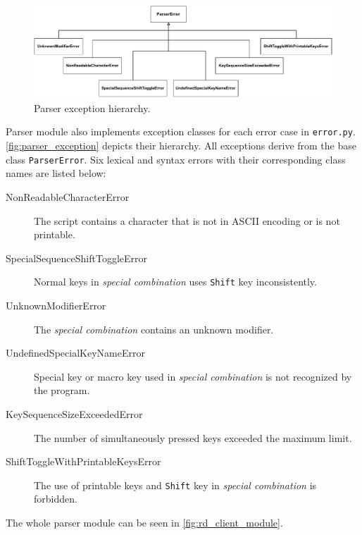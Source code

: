 \begin{figure}[ht]
    \centering
    \includegraphics[width=\linewidth]{./obrazky-figures/exception_classes.pdf}
    \caption{Parser exception hierarchy.}
    \label{fig:parser_exception}
\end{figure}

Parser module also implements exception classes for each error case in \verb|error.py|. \autoref{fig:parser_exception} depicts their hierarchy. All exceptions derive from the base class \verb|ParserError|. Six lexical and syntax errors with their corresponding class names are listed below:
\begin{description}
    \item [NonReadableCharacterError] The script contains a character that is not in ASCII encoding or is not printable.
    \item [SpecialSequenceShiftToggleError] Normal keys in \emph{special combination} uses \texttt{Shift} key inconsistently.
    \item [UnknownModifierError] The \emph{special combination} contains an unknown modifier.
    \item [UndefinedSpecialKeyNameError] Special key or macro key used in \emph{special combination} is not recognized by the program.
    \item [KeySequenceSizeExceededError] The number of simultaneously pressed keys exceeded the maximum limit.
    \item [ShiftToggleWithPrintableKeysError] The use of printable keys and \texttt{Shift} key in \emph{special combination} is forbidden.
\end{description}
The whole parser module can be seen in \autoref{fig:rd_client_module}.
